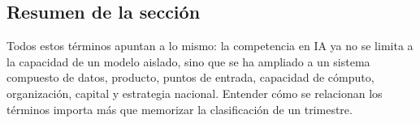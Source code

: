 \subsection{Resumen de la sección}

Todos estos términos apuntan a lo mismo: la competencia en IA ya no se limita a la capacidad de un modelo aislado, sino que se ha ampliado a un sistema compuesto de datos, producto, puntos de entrada, capacidad de cómputo, organización, capital y estrategia nacional. Entender cómo se relacionan los términos importa más que memorizar la clasificación de un trimestre.
